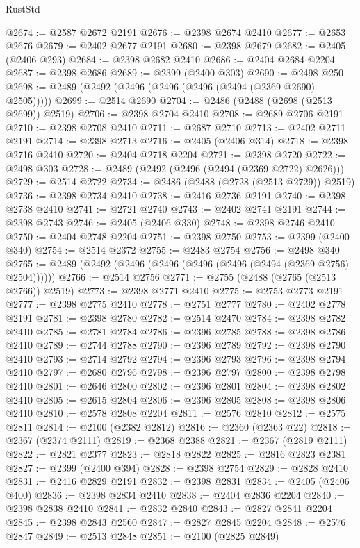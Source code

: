 \begin{lexlean}{RustStd}
\begin{coremodule}
{\begin{coremodule}
{{{{{{{{{{{{{{{{{{{{{{{{{{{{{{{{{{{{{{{{{{{{{{{{{{@2674 := @2587 @2672 @2191
@2676 := @2398 @2674 @2410
@2677 := @2653 @2676
@2679 := @2402 @2677 @2191
@2680 := @2398 @2679
@2682 := @2405 (@2406 @293)
@2684 := @2398 @2682 @2410
@2686 := @2404 @2684 @2204
@2687 := @2398 @2686
@2689 := @2399 (@2400 @303)
@2690 := @2498 @250
@2698 := @2489 (@2492 (@2496 (@2496 (@2496 (@2494 (@2369 @2690) @2505)))))
@2699 := @2514 @2690
@2704 := @2486 (@2488 (@2698 (@2513 @2699)) @2519)
@2706 := @2398 @2704 @2410
@2708 := @2689 @2706 @2191
@2710 := @2398 @2708 @2410
@2711 := @2687 @2710
@2713 := @2402 @2711 @2191
@2714 := @2398 @2713
@2716 := @2405 (@2406 @314)
@2718 := @2398 @2716 @2410
@2720 := @2404 @2718 @2204
@2721 := @2398 @2720
@2722 := @2498 @303
@2728 := @2489 (@2492 (@2496 (@2494 (@2369 @2722) @2626)))
@2729 := @2514 @2722
@2734 := @2486 (@2488 (@2728 (@2513 @2729)) @2519)
@2736 := @2398 @2734 @2410
@2738 := @2416 @2736 @2191
@2740 := @2398 @2738 @2410
@2741 := @2721 @2740
@2743 := @2402 @2741 @2191
@2744 := @2398 @2743
@2746 := @2405 (@2406 @330)
@2748 := @2398 @2746 @2410
@2750 := @2404 @2748 @2204
@2751 := @2398 @2750
@2753 := @2399 (@2400 @340)
@2754 := @2514 @2372
@2755 := @2483 @2754
@2756 := @2498 @340
@2765 := @2489 (@2492 (@2496 (@2496 (@2496 (@2496 (@2494 (@2369 @2756) @2504))))))
@2766 := @2514 @2756
@2771 := @2755 (@2488 (@2765 (@2513 @2766)) @2519)
@2773 := @2398 @2771 @2410
@2775 := @2753 @2773 @2191
@2777 := @2398 @2775 @2410
@2778 := @2751 @2777
@2780 := @2402 @2778 @2191
@2781 := @2398 @2780
@2782 := @2514 @2470
@2784 := @2398 @2782 @2410
@2785 := @2781 @2784
@2786 := @2396 @2785
@2788 := @2398 @2786 @2410
@2789 := @2744 @2788
@2790 := @2396 @2789
@2792 := @2398 @2790 @2410
@2793 := @2714 @2792
@2794 := @2396 @2793
@2796 := @2398 @2794 @2410
@2797 := @2680 @2796
@2798 := @2396 @2797
@2800 := @2398 @2798 @2410
@2801 := @2646 @2800
@2802 := @2396 @2801
@2804 := @2398 @2802 @2410
@2805 := @2615 @2804
@2806 := @2396 @2805
@2808 := @2398 @2806 @2410
@2810 := @2578 @2808 @2204
@2811 := @2576 @2810
@2812 := @2575 @2811
@2814 := @2100 (@2382 @2812)
@2816 := @2360 (@2363 @22)
@2818 := @2367 (@2374 @2111)
@2819 := @2368 @2388
@2821 := @2367 (@2819 @2111)
@2822 := @2821 @2377
@2823 := @2818 @2822
@2825 := @2816 @2823 @2381
@2827 := @2399 (@2400 @394)
@2828 := @2398 @2754
@2829 := @2828 @2410
@2831 := @2416 @2829 @2191
@2832 := @2398 @2831
@2834 := @2405 (@2406 @400)
@2836 := @2398 @2834 @2410
@2838 := @2404 @2836 @2204
@2840 := @2398 @2838 @2410
@2841 := @2832 @2840
@2843 := @2827 @2841 @2204
@2845 := @2398 @2843 @2560
@2847 := @2827 @2845 @2204
@2848 := @2576 @2847
@2849 := @2513 @2848
@2851 := @2100 (@2825 @2849)
}}}}}}}}}}}}}}}}}}}}}}}}}}}}}}}}}}}}}}}}}}}}}}}}}}
\end{coremodule}}
\end{coremodule}
\end{lexlean}
